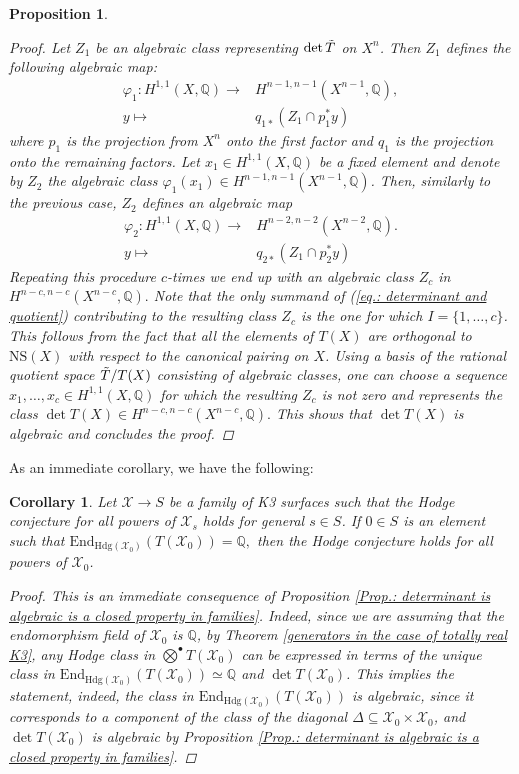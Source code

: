\documentclass[11pt,twoside,a4paper]{amsart}
\newcommand{\0}{\mathscr{O}}
\newcommand{\Q}{\mathbb{Q}}
\newcommand{\T}{\Tilde{T}}
\newcommand{\X}{\mathscr{X}}
\theoremstyle{plain}
\newtheorem{cor}[thm]{Corollary}
\newtheorem{prop}[thm]{Proposition}
\theoremstyle{definition}
\theoremstyle{remark}
\begin{document}
\begin{prop}
\begin{proof}
Let $Z_1$ be an algebraic class representing $\det \T$ on $X^n$.
Then $Z_1$ defines the following algebraic map:
\begin{align*}
    \varphi_1\colon H^{1,1}(X,\Q) \longrightarrow & H^{n-1,n-1}(X^{n-1},\Q),\\
    y \longmapsto & q_{1*}(Z_1\cap p_1^*y)
\end{align*}
where $p_1$ is the projection from $X^n$ onto the first factor and $q_1$ is the projection onto the remaining factors. 
Let $x_1\in H^{1,1}(X,\Q)$ be a fixed element and denote by $Z_2$ the algebraic class $\varphi_1(x_1)\in H^{n-1,n-1}(X^{n-1},\Q)$. Then, similarly to the previous case, $Z_2$ defines an algebraic map
\begin{align*}
    \varphi_2\colon H^{1,1}(X,\Q) \longrightarrow & H^{n-2,n-2}(X^{n-2},\Q).\\
    y \longmapsto & q_{2*}(Z_1\cap p_2^*y)
\end{align*}
Repeating this procedure $c$-times we end up with an algebraic class $Z_c$ in $H^{n-c,n-c}(X^{n-c},\Q).$ Note that the only summand of (\ref{eq.: determinant and quotient}) contributing to the resulting class $Z_c$ is the one for which $I=\{1,\ldots,c\}$. This follows from the fact that all the elements of $T(X)$ are orthogonal to $\mathrm{NS}(X)$ with respect to the canonical pairing on $X$. 
Using a basis of the rational quotient space $\T/T(X)$ consisting of algebraic classes, one can choose a sequence $x_1,\ldots,x_c\in H^{1,1}(X,\Q)$ for which the resulting $Z_c$ is not zero and represents the class $\det T(X)\in H^{n-c,n-c}(X^{n-c},\Q).$ This shows that $\det T(X)$ is algebraic and concludes the proof.
\end{proof}
\end{prop}
As an immediate corollary, we have the following:
\begin{cor}
\label{Cor.: when the determinant is the only class to study}
Let $\X\rightarrow S$ be a family of K3 surfaces such that the Hodge conjecture for all powers of $\X_s$ holds  for general $s\in S$. If $0\in S$ is an element such that $\mathrm{End}_{\mathrm{Hdg}(\X_0)}(T(\X_0))=\Q,$ then the Hodge conjecture holds for all powers of $\X_0$.
\begin{proof}
This is an immediate consequence of Proposition \ref{Prop.: determinant is algebraic is a closed property in families}. Indeed, since we are assuming that the endomorphism field of $\X_0$ is $\Q$, by Theorem \ref{generators in the case of totally real K3}, any Hodge class in $\bigotimes^{\bullet} T(\X_0)$ can be expressed in terms of the unique class in $\mathrm{End}_{\mathrm{Hdg}(\X_0)}(T(\X_0))\simeq \Q$ and $\det T(\X_0)$. This implies the statement, indeed, the class in $\mathrm{End}_{\mathrm{Hdg}(\X_0)}(T(\X_0))$ is algebraic, since it corresponds to a component of the class of the diagonal $\Delta\subseteq \X_0\times \X_0$, and $\det T(\X_0)$ is algebraic by Proposition \ref{Prop.: determinant is algebraic is a closed property in families}.
\end{proof}
\end{cor}
\end{document}
